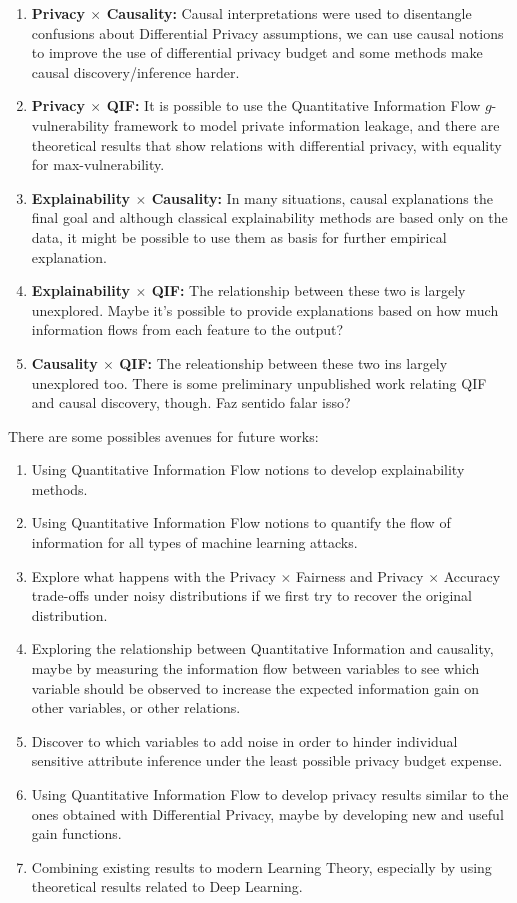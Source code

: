 \documentclass{article}
\begin{document}
\begin{enumerate}
    \item \textbf{Privacy $\times$ Causality:} Causal interpretations were used to disentangle confusions about Differential Privacy assumptions, we can use causal notions to improve the use of differential privacy budget and some methods make causal discovery/inference harder.
    \item \textbf{Privacy $\times$ QIF:} It is possible to use the Quantitative Information Flow $g$-vulnerability framework to model private information leakage, and there are theoretical results that show relations with differential privacy, with equality for max-vulnerability.
    \item \textbf{Explainability $\times$ Causality:} In many situations, causal explanations the final goal and although classical explainability methods are based only on the data, it might be possible to use them as basis for further empirical explanation.
    \item \textbf{Explainability $\times$ QIF:} The relationship between these two is largely unexplored. Maybe it's possible to provide explanations based on how much information flows from each feature to the output?
    \item \textbf{Causality $\times$ QIF:} The releationship between these two ins largely unexplored too. There is some preliminary unpublished work relating QIF and causal discovery, though. {\color{orange} Faz sentido falar isso?}
\end{enumerate}

There are some possibles avenues for future works:

\begin{enumerate}
    \item Using Quantitative Information Flow notions to develop explainability methods.
    \item Using Quantitative Information Flow notions to quantify the flow of information for all types of machine learning attacks.
    \item Explore what happens with the Privacy $\times$ Fairness and Privacy $\times$ Accuracy trade-offs under noisy distributions if we first try to recover the original distribution.
    \item Exploring the relationship between Quantitative Information and causality, maybe by measuring the information flow between variables to see which variable should be observed to increase the expected information gain on other variables, or other relations.
    \item Discover to which variables to add noise in order to hinder individual sensitive attribute inference under the least possible privacy budget expense.
    \item Using Quantitative Information Flow to develop privacy results similar to the ones obtained with Differential Privacy, maybe by developing new and useful gain functions.
    \item Combining existing results to modern Learning Theory, especially by using theoretical results related to Deep Learning.
\end{enumerate}
\end{document}
